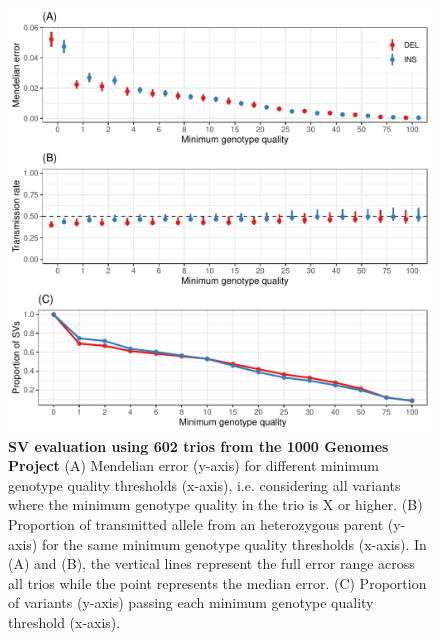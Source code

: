\documentclass[11pt]{ucscthesis}
\begin{document}
\begin{figure}[p]
  \includegraphics[width=\linewidth]{fig-sv-trio-eval.pdf}
  \caption[SV evaluation using 602 trios from the 1000 Genomes Project]{{\bf SV evaluation using 602 trios from the 1000 Genomes Project}
    (A) Mendelian error (y-axis) for different minimum genotype quality thresholds (x-axis), i.e. considering all variants where the minimum genotype quality in the trio is X or higher.
    (B) Proportion of transmitted allele from an heterozygous parent (y-axis) for the same minimum genotype quality thresholds (x-axis).
    In (A) and (B), the vertical lines represent the full error range across all trios while the point represents the median error.
    (C) Proportion of variants (y-axis) passing each minimum genotype quality threshold (x-axis).
  }
  \label{fig:sv-trio-eval}
\end{figure}
\end{document}
